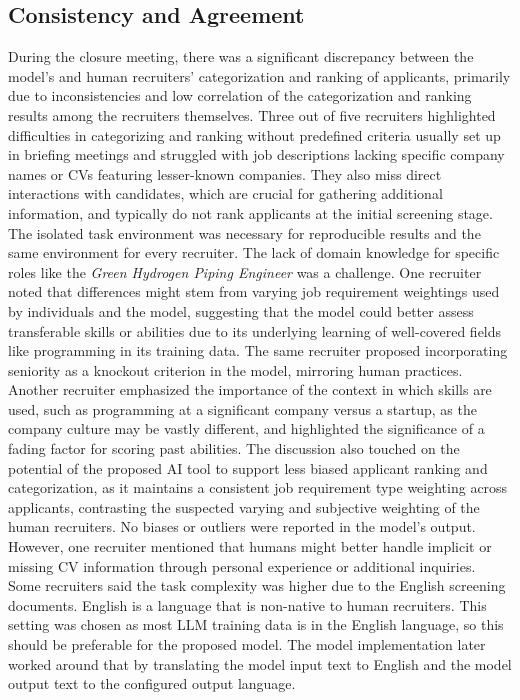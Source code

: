 \documentclass[draft,final]{thesisclass} %
\begin{document}
\subsection{Consistency and Agreement}
During the closure meeting, there was a significant discrepancy between the model's and human recruiters' categorization and ranking of applicants, primarily due to inconsistencies and low correlation of the categorization and ranking results among the recruiters themselves. Three out of five recruiters highlighted difficulties in categorizing and ranking without predefined criteria usually set up in briefing meetings and struggled with job descriptions lacking specific company names or \acs{CV}s featuring lesser-known companies. They also miss direct interactions with candidates, which are crucial for gathering additional information, and typically do not rank applicants at the initial screening stage. The isolated task environment was necessary for reproducible results and the same environment for every recruiter. The lack of domain knowledge for specific roles like the \textit{Green Hydrogen Piping Engineer} was a challenge. One recruiter noted that differences might stem from varying job requirement weightings used by individuals and the model, suggesting that the model could better assess transferable skills or abilities due to its underlying learning of well-covered fields like programming in its training data.
The same recruiter proposed incorporating seniority as a knockout criterion in the model, mirroring human practices. Another recruiter emphasized the importance of the context in which skills are used, such as programming at a significant company versus a startup, as the company culture may be vastly different, and highlighted the significance of a fading factor for scoring past abilities. The discussion also touched on the potential of the proposed \acs{AI} tool to support less biased applicant ranking and categorization, as it maintains a consistent job requirement type weighting across applicants, contrasting the suspected varying and subjective weighting of the human recruiters. No biases or outliers were reported in the model's output. However, one recruiter mentioned that humans might better handle implicit or missing \acs{CV} information through personal experience or additional inquiries. Some recruiters said the task complexity was higher due to the English screening documents. English is a language that is non-native to human recruiters. This setting was chosen as most \gls{LLM} training data is in the English language, so this should be preferable for the proposed model. The model implementation later worked around that by translating the model input text to English and the model output text to the configured output language.
\end{document}
